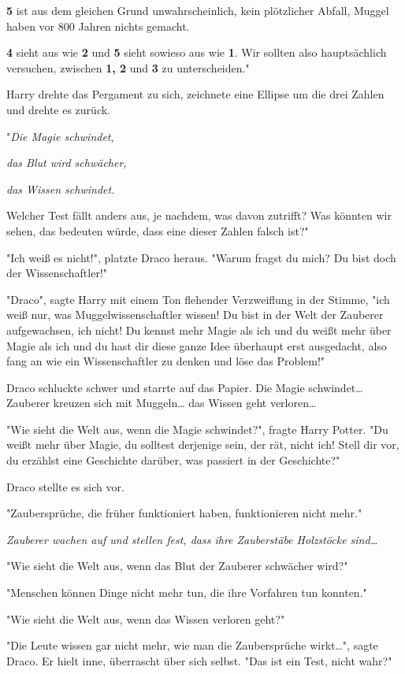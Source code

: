 {\textbf{5} ist aus dem gleichen Grund unwahrscheinlich, kein plötzlicher Abfall, Muggel haben vor 800 Jahren nichts gemacht.

\textbf{4} sieht aus wie \textbf{2} und \textbf{5} sieht sowieso aus wie \textbf{1}. Wir sollten also hauptsächlich versuchen, zwischen \textbf{1, 2} und \textbf{3} zu unterscheiden."

Harry drehte das Pergament zu sich, zeichnete eine Ellipse um die drei Zahlen und drehte es zurück.

"\emph{Die Magie schwindet},

\emph{das Blut wird schwächer,}

\emph{das Wissen schwindet.}

Welcher Test fällt anders aus, je nachdem, was davon zutrifft? Was könnten wir sehen, das bedeuten würde, dass eine dieser Zahlen falsch ist?"

"Ich weiß es nicht!", platzte Draco heraus. "Warum fragst du mich? Du bist doch der Wissenschaftler!"

"Draco", sagte Harry mit einem Ton flehender Verzweiflung in der Stimme, "ich weiß nur, was Muggelwissenschaftler wissen! Du bist in der Welt der Zauberer aufgewachsen, ich nicht! Du kennst mehr Magie als ich und du weißt mehr über Magie als ich und du hast dir diese ganze Idee überhaupt erst ausgedacht, also fang an wie ein Wissenschaftler zu denken und löse das Problem!"

Draco schluckte schwer und starrte auf das Papier. Die Magie schwindet… Zauberer kreuzen sich mit Muggeln… das Wissen geht verloren…

"Wie sieht die Welt aus, wenn die Magie schwindet?", fragte Harry Potter. "Du weißt mehr über Magie, du solltest derjenige sein, der rät, nicht ich! Stell dir vor, du erzählst eine Geschichte darüber, was passiert in der Geschichte?"

Draco stellte es sich vor.

"Zaubersprüche, die früher funktioniert haben, funktionieren nicht mehr."

\emph{Zauberer wachen auf und stellen fest, dass ihre Zauberstäbe Holzstöcke sind…}

"Wie sieht die Welt aus, wenn das Blut der Zauberer schwächer wird?"

"Menschen können Dinge nicht mehr tun, die ihre Vorfahren tun konnten."

"Wie sieht die Welt aus, wenn das Wissen verloren geht?"

"Die Leute wissen gar nicht mehr, wie man die Zaubersprüche wirkt…", sagte Draco. Er hielt inne, überrascht über sich selbst. "Das ist ein Test, nicht wahr?"

}
